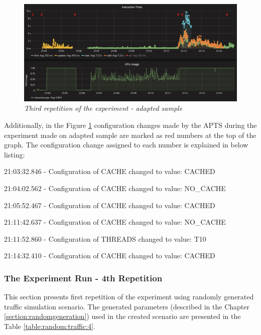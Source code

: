 \documentclass[12pt,a4paper]{article}
\let\tmpone\enumerate
\let\tmptwo\endenumerate
\renewenvironment{enumerate}{\tmpone\addtolength{\itemsep}{-0.4\baselineskip}}{\tmptwo}
\begin{document}
\begin{figure}[!htb]
\centering
\includegraphics[width=1\textwidth]{3-adap}
\caption{\textit{Third repetition of the experiment - adapted sample}} \label{figure:random:screen:adapted:3}
\end{figure}

Additionally, in the Figure \ref{figure:random:screen:adapted:3} configuration changes made by the APTS during the experiment made on adapted sample are marked as red numbers at the top of the graph. The configuration change assigned to each number is explained in below listing: 

\begin{enumerate}
\item 21:03:32.846 - Configuration of CACHE changed to value: CACHED
\item 21:04:02.562 - Configuration of CACHE changed to value: NO\_CACHE
\item 21:05:52.467 - Configuration of CACHE changed to value: CACHED
\item 21:11:42.637 - Configuration of CACHE changed to value: NO\_CACHE
\item 21:11:52.860 - Configuration of THREADS changed to value: T10
\item 21:14:32.410 - Configuration of CACHE changed to value: CACHED
\end{enumerate}






\subsubsection{The Experiment Run - 4th Repetition}

This section presents first repetition of the experiment using randomly generated traffic simulation scenario. The generated parameters (described in the Chapter \ref{section:randomgeneration}) used in the created scenario are presented in the Table \ref{table:random:traffic:4}. 
\end{document}
